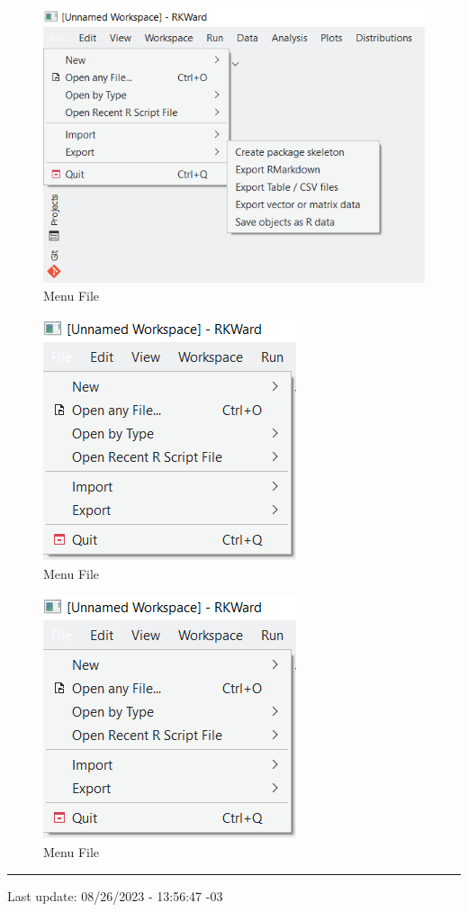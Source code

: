 \documentclass[
  letterpaper,
  DIV=11,
  numbers=noendperiod]{scrreprt}
\begin{document}
\begin{figure}

{\centering \includegraphics{./images/menu_file/menu_file_export.png}

}

\caption{Menu File}

\end{figure}

\begin{figure}

{\centering \includegraphics{./images/menu_file/menu_file.png}

}

\caption{Menu File}

\end{figure}

\begin{figure}

{\centering \includegraphics{./images/menu_file/menu_file.png}

}

\caption{Menu File}

\end{figure}

\begin{center}\rule{0.5\linewidth}{0.5pt}\end{center}

Last update: 08/26/2023 - 13:56:47 -03
\end{document}
